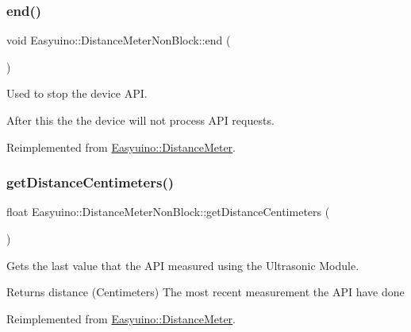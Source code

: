 \subsubsection{\texorpdfstring{end()}{end()}}
{\footnotesize\ttfamily void Easyuino\+::\+Distance\+Meter\+Non\+Block\+::end (\begin{DoxyParamCaption}{ }\end{DoxyParamCaption})\hspace{0.3cm}{\ttfamily [virtual]}}



Used to stop the device A\+PI. 

After this the the device will not process A\+PI requests. 

Reimplemented from \hyperlink{class_easyuino_1_1_distance_meter_a8a818cc922418ae5a078193dbfab1e6b}{Easyuino\+::\+Distance\+Meter}.

\mbox{\label{class_easyuino_1_1_distance_meter_non_block_a00419fc2c2ff7c587735063971aa7464}} 
\subsubsection{\texorpdfstring{get\+Distance\+Centimeters()}{getDistanceCentimeters()}}
{\footnotesize\ttfamily float Easyuino\+::\+Distance\+Meter\+Non\+Block\+::get\+Distance\+Centimeters (\begin{DoxyParamCaption}{ }\end{DoxyParamCaption})\hspace{0.3cm}{\ttfamily [virtual]}}



Gets the last value that the A\+PI measured using the Ultrasonic Module. 

\begin{DoxyReturn}{Returns}
distance (Centimeters) The most recent measurement the A\+PI have done 
\end{DoxyReturn}


Reimplemented from \hyperlink{class_easyuino_1_1_distance_meter_a637cdd0d3e4f3bcf094704ae91e0c7c3}{Easyuino\+::\+Distance\+Meter}.

\mbox{\label{class_easyuino_1_1_distance_meter_non_block_a88f2b7e249345b93a8258ae5c7b75a49}} 
